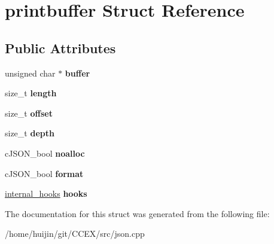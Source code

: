 \hypertarget{structprintbuffer}{\section{printbuffer Struct Reference}
\label{structprintbuffer}
}
\subsection*{Public Attributes}
\begin{DoxyCompactItemize}
\item 
\hypertarget{structprintbuffer_a754f63618e91db99f7ab6cfc4e629013}{unsigned char $\ast$ {\bfseries buffer}}\label{structprintbuffer_a754f63618e91db99f7ab6cfc4e629013}

\item 
\hypertarget{structprintbuffer_a1a679f8b6fe9b413fb3a87203b0f5bc8}{size\-\_\-t {\bfseries length}}\label{structprintbuffer_a1a679f8b6fe9b413fb3a87203b0f5bc8}

\item 
\hypertarget{structprintbuffer_a3ed6f9d24d6591047680492a962dc7c9}{size\-\_\-t {\bfseries offset}}\label{structprintbuffer_a3ed6f9d24d6591047680492a962dc7c9}

\item 
\hypertarget{structprintbuffer_aa7311b5da38ff8d1737824c611b48732}{size\-\_\-t {\bfseries depth}}\label{structprintbuffer_aa7311b5da38ff8d1737824c611b48732}

\item 
\hypertarget{structprintbuffer_aa2a7966b71dc3535e4e3789c33ec5368}{c\-J\-S\-O\-N\-\_\-bool {\bfseries noalloc}}\label{structprintbuffer_aa2a7966b71dc3535e4e3789c33ec5368}

\item 
\hypertarget{structprintbuffer_a75d3f480f5308e7f4afecf30e11277ef}{c\-J\-S\-O\-N\-\_\-bool {\bfseries format}}\label{structprintbuffer_a75d3f480f5308e7f4afecf30e11277ef}

\item 
\hypertarget{structprintbuffer_a43a8b3bcc644432f12f5aed5159d2520}{\hyperlink{structinternal__hooks}{internal\-\_\-hooks} {\bfseries hooks}}\label{structprintbuffer_a43a8b3bcc644432f12f5aed5159d2520}

\end{DoxyCompactItemize}


The documentation for this struct was generated from the following file\-:\begin{DoxyCompactItemize}
\item 
/home/huijin/git/\-C\-C\-E\-X/src/json.\-cpp\end{DoxyCompactItemize}
